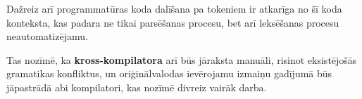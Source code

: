 Dažreiz arī programmatūras koda dalīšana pa tokeniem ir atkarīga no šī koda konteksta, kas padara ne tikai parsēšanas procesu, bet arī leksēšanas procesu neautomatizējamu. 

Tas nozīmē, ka \textbf{kross-kompilatora} arī būs jāraksta manuāli, risinot eksistējošās gramatikas konfliktus, un oriģinālvalodas ievērojamu izmaiņu gadījumā būs jāpastrādā abi kompilatori, kas nozīmē divreiz vairāk darba.



